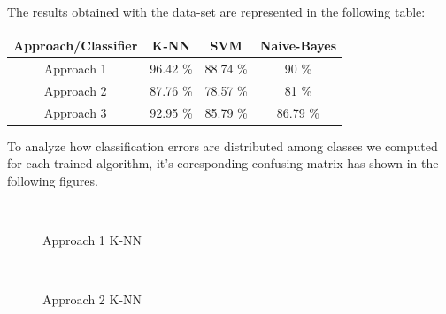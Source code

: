 The results obtained with the data-set are represented in the following table:\bigskip

\begin{center}
\begin{tabular}{ |c|c|c|c| }
 \hline
 Approach/Classifier & K-NN & SVM & Naive-Bayes \\
 \hline
 Approach 1 & 96.42 \%  & 88.74 \%  & 90 \%  \\
 \hline
 Approach 2 & 87.76 \%  & 78.57 \%  & 81 \%  \\
 \hline
 Approach 3 & 92.95 \%  & 85.79 \%  & 86.79 \% \\
 \hline
\end{tabular}
\end{center}
\bigskip

To analyze how classification errors are distributed among classes we computed for each trained algorithm, it's coresponding confusing matrix has shown in the following figures.\bigskip

\begin{figure}[h]
\begin{dBox}
\centering
 \mbox{
  }
  \caption{Approach 1 K-NN\label{fig:apr1_knn} }   
\end{dBox}   
\end{figure}

\begin{figure}[h]
\begin{dBox}
\centering
 \mbox{
  }
  \caption{Approach 2 K-NN\label{fig:apr2_knn} }
  
\end{dBox}   
\end{figure}

